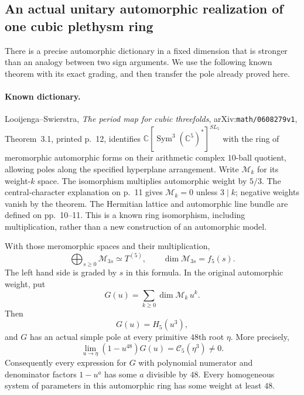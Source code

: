 \subsection{An actual unitary automorphic realization of one cubic plethysm ring}

There is a precise automorphic dictionary in a fixed dimension that is
stronger than an analogy between two sign arguments. We use the following
known theorem with its exact grading, and then transfer the pole already
proved here.

\paragraph{Known dictionary.}
Looijenga--Swierstra, \emph{The period map for cubic threefolds},
arXiv:\texttt{math/0608279v1}, Theorem~3.1, printed p.~12, identifies
$\mathbb C[\operatorname{Sym}^3(\mathbb C^5)^*]^{SL_5}$ with the
ring of meromorphic automorphic forms on their arithmetic complex
$10$-ball quotient, allowing poles along the specified hyperplane
arrangement. Write $\mathcal M_k$ for its weight-$k$ space.
The isomorphism multiplies automorphic weight by $5/3$.
The central-character explanation on p.~11 gives
$\mathcal M_k=0$ unless $3\mid k$; negative weights vanish
by the theorem. The Hermitian lattice and automorphic line
bundle are defined on pp.~10--11. This is a known ring
isomorphism, including multiplication, rather than a
new construction of an automorphic model.

\begin{corollary}
\label{cor:automorphiccubic}
With those meromorphic spaces and their multiplication,
\[
 \bigoplus_{s\ge0}\mathcal M_{3s}\simeq T^{(5)},\qquad
 \dim\mathcal M_{3s}=f_5(s).
 \tag{P-F37a}
\]
The left hand side is graded by $s$ in this formula.
In the original automorphic weight, put
\[
 G(u)=\sum_{k\ge0}\dim\mathcal M_k\,u^k.
\]
Then
\[
                         G(u)=H_5(u^3),
 \tag{P-F37b}
\]
and $G$ has an actual simple pole at every primitive
$48$th root $\eta$. More precisely,
\[
 \lim_{u\to\eta}(1-u^{48})G(u)
                          =\mathcal C_5(\eta^3)\ne0.
 \tag{P-F37c}
\]
Consequently every expression for $G$ with polynomial numerator
and denominator factors $1-u^a$ has some $a$ divisible by $48$.
Every homogeneous system of parameters in this automorphic
ring has some weight at least $48$.
\end{corollary}

